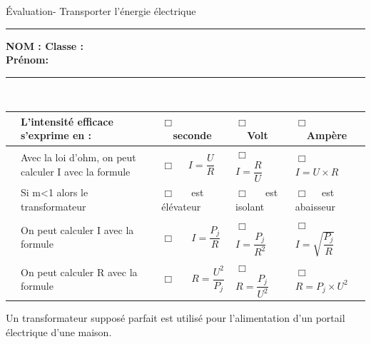 \documentclass[11pt,a4paper]{article}
\begin{document}
\noindent

\begin{center}
\LARGE{Évaluation- Transporter l'énergie électrique}\\[8mm]
\end{center}
\normalsize
\hrule 


\flushleft \textbf{NOM : \hfill Classe : \hspace{3cm} ~~\\[2mm]
Prénom:\\[0,4cm]
}
\hrule\
\\[0,2cm]

\vspace {8 mm}




    \begin{tabular}{p{2mm} p{5.5cm}|C{3cm}|C{3cm}|C{3cm}}
    

         & L'intensité efficace s'exprime en :& $\Box $ ~~seconde & $\Box $ ~~Volt  & $\Box $ ~~Ampère \\
         \hline
       & Avec la loi d'ohm, on peut calculer I avec la formule   & $\Box $ ~~$I=\dfrac{U}{R}$   & $\Box $ ~~ $I = \dfrac{R}{U}$ & $\Box $ ~~$I=U \times R$\\
        \hline
          & Si m<1 alors le transformateur  &$\Box $ ~~ est élévateur  &$\Box $ ~~ est isolant  & $\Box $ ~~est abaisseur  \\
         \hline
          &On peut calculer I avec la formule  &$\Box $ ~~ $I=\dfrac{P_j}{R}$  &$\Box $ ~~ $I=\dfrac{P_j}{R^2}$  & $\Box $ ~~$I=\sqrt{\dfrac{P_j}{R}}$  \\

         \hline
         
         & On peut calculer R avec la formule &$\Box $ ~~ $R=\dfrac{U^2}{P_j}$  &$\Box $ ~~ $R= \dfrac{P_j}{U^2}$  & $\Box $ ~~ $R=P_j \times U^2$  \\

 
        
         \end{tabular}
\vspace{3mm}


Un transformateur supposé parfait est utilisé pour l'alimentation d'un portail électrique d'une maison. 
\end{document}
